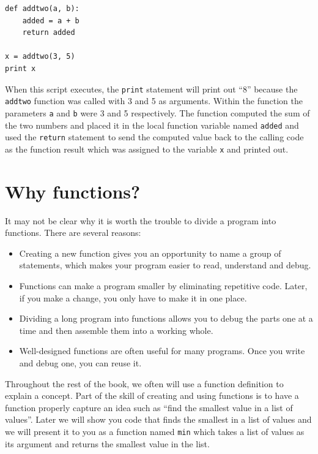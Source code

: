 \documentclass[10pt]{book}
\begin{document}
\beforeverb
\begin{verbatim}
def addtwo(a, b):
    added = a + b
    return added

x = addtwo(3, 5)
print x
\end{verbatim}
\afterverb
%
When this script executes, the {\tt print} statement will print out ``8''
because the {\tt addtwo} function was called with 3 and 5 as arguments.
Within the function the parameters {\tt a} and {\tt b} were 3 and 5 
respectively. The function computed the sum of the two numbers and placed
it in the local function variable named {\tt added} 
and used the {\tt return} statement 
to send the computed value back to the calling code 
as the function result which was assigned
to the variable {\tt x} and printed out.


\section{Why functions?}

It may not be clear why it is worth the trouble to divide
a program into functions.  There are several reasons:

\begin{itemize}

\item Creating a new function gives you an opportunity to name a group
of statements, which makes your program easier to read, understand 
and debug.

\item Functions can make a program smaller by eliminating repetitive
code.  Later, if you make a change, you only have
to make it in one place.

\item Dividing a long program into functions allows you to debug the
parts one at a time and then assemble them into a working whole.

\item Well-designed functions are often useful for many programs.
Once you write and debug one, you can reuse it.

\end{itemize}

Throughout the rest of the book, we often will use a function definition to 
explain a concept.  Part of the skill of creating and using functions is
to have a function properly capture an idea such as ``find the smallest
value in a list of values''.  Later we will show you code that finds
the smallest in a list of values and we will present it to you as a function
named {\tt min} which takes a list of values as its argument and 
returns the smallest value in the list.
\end{document}
